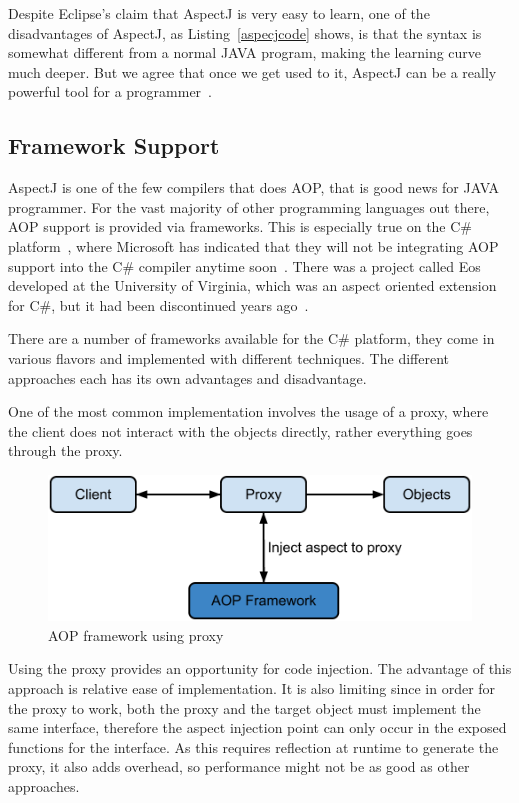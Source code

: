 Despite Eclipse's claim that AspectJ is very easy to learn, one of the disadvantages of AspectJ, as Listing~\ref{aspecjcode} shows, is that the syntax is somewhat different from a normal JAVA program, making the learning curve much deeper. But we agree that once we get used to it, AspectJ can be a really powerful tool for a programmer~\cite{aspectj_text}.

\subsection{Framework Support}

AspectJ is one of the few compilers that does AOP, that is good news for JAVA programmer. For the vast majority of other programming languages out there, AOP support is provided via frameworks. This is especially true on the C\# platform~\cite{aopcs}, where Microsoft has indicated that they will not be integrating AOP support into the C\# compiler anytime soon~\cite{mastermind_text}. There was a project called Eos developed at the University of Virginia, which was an aspect oriented extension for C\#, but it had been discontinued years ago~\cite{eos_site, eos}.

There are a number of frameworks available for the C\# platform, they come in various flavors and implemented with different techniques. The different approaches each has its own advantages and disadvantage.

One of the most common implementation involves the usage of a proxy, where the client does not interact with the objects directly, rather everything goes through the proxy.

\begin{figure}[here]
  \includegraphics[scale=0.70]{proxy.png}
  \centering
  \caption{AOP framework using proxy\label{proxy_model}}
\end{figure}

Using the proxy provides an opportunity for code injection. The advantage of this approach is relative ease of implementation. It is also limiting since in order for the proxy to work, both the proxy and the target object must implement the same interface, therefore the aspect injection point can only occur in the exposed functions for the interface. As this requires reflection at runtime to generate the proxy, it also adds overhead, so performance might not be as good as other approaches.

